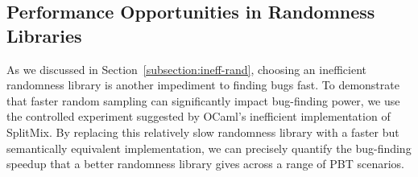 \documentclass[acmsmall]{acmart}
\theoremstyle{definition}
\begin{document}

\subsection{Performance Opportunities in Randomness Libraries}
\label{subsection:faster-rng}
As we discussed in Section~\ref{subsection:ineff-rand}, choosing an inefficient randomness library is
another impediment to finding bugs fast.
To demonstrate that faster random sampling can significantly impact bug-finding power, we
use the controlled experiment suggested by OCaml's inefficient implementation of
SplitMix. By replacing this relatively slow randomness library with a faster but semantically equivalent
implementation, we can precisely quantify the bug-finding speedup that a better randomness library gives across a range of PBT scenarios.
\end{document}
